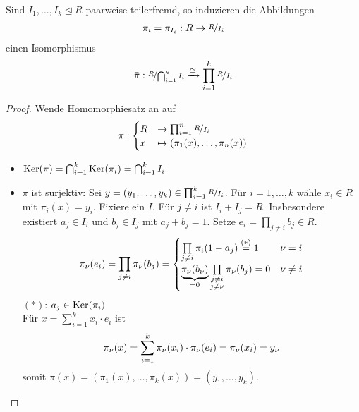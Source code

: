 \begin{theorem}
	Sind $I_1, \dots , I_k \unlhd R$ paarweise teilerfremd, so induzieren die Abbildungen
	\begin{align}
		\pi_i = \pi_{I_i} : R \to \nicefrac{R}{I_i}\notag
	\end{align}
	einen Isomorphismus
	\begin{align}
		\bar{\pi}: \nicefrac{R}{\bigcap_{i=1}^{k} I_i} \xrightarrow{\cong} \prod_{i=1}^{k} \nicefrac{R}{I_i} \notag
	\end{align}
\end{theorem}
\begin{proof}
	Wende Homomorphiesatz an auf
	\begin{align}
	\pi: \begin{cases}
	R &\to \prod_{i=1}^{n} \nicefrac{R}{I_i} \\
	x &\mapsto (\pi_1(x), \dots, \pi_n(x))
	\end{cases} \notag
	\end{align}
	\begin{itemize}
		\item $\operatorname{Ker}(\pi) = \bigcap_{i=1}^{k}\operatorname{Ker}(\pi_i) = \bigcap_{i=1}^{k} I_i$
		\item $\pi$ ist surjektiv: Sei $y=(y_1, \dots, y_k) \in \prod_{i=1}^{k} \nicefrac{R}{I_i}$. Für $i = 1,\dots,k$ wähle $x_i \in R$ mit $\pi_i(x) = y_i$. Fixiere ein $I$. Für $j \neq i$ ist $I_i + I_j = R$. Insbesondere existiert $a_j \in I_i$ und $b_j \in I_j$ mit $a_j + b_j = 1$. Setze $e_i = \prod_{j\neq i} b_j \in R$.
		\begin{align}
		\pi_{\nu}(e_i) = \prod_{j \neq i} \pi_{\nu}(b_j) = \begin{cases}
		\prod\limits_{j\neq i} \pi_i(1-a_j) \overset{(\ast)}{=} 1 & \nu = i\\
		\underbrace{\pi_{\nu}(b_{\nu})}_{=0}\prod\limits_{\substack{j\neq i \\ j \neq \nu}} \pi_{\nu}(b_j) = 0 & \nu \neq i
		\end{cases}\notag
		\end{align}
		$(\ast)$: $a_j\in\operatorname{Ker}(\pi_i)$ \\
		Für $x = \sum_{i=1}^{k}x_i \cdot e_i$ ist 
		\begin{align}
			\pi_{\nu}(x) = \sum_{i=1}^{k} \pi_{\nu}(x_i)\cdot\pi_{\nu}(e_i) = \pi_{\nu}(x_i) = y_{\nu} \notag
		\end{align}
		somit $\pi(x) = (\pi_1(x), \dots, \pi_k(x)) = (y_1, \dots, y_k)$. 
	\end{itemize}
\end{proof}

